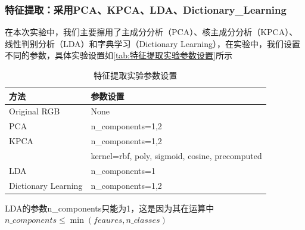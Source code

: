 \documentclass[12pt,hyperref,a4paper,UTF8]{ctexart}
\begin{document}
\subsubsection{特征提取：采用PCA、KPCA、LDA、Dictionary\_Learning}
在本次实验中，我们主要擦用了主成分分析（PCA）、核主成分分析（KPCA）、线性判别分析（LDA）和字典学习（Dictionary Learning），在实验中，我们设置不同的参数，具体实验设置如\autoref{tab:特征提取实验参数设置}所示

\begin{table}[!htbp]

\caption{特征提取实验参数设置}
    \centering
    \begin{tabular}{ll}
    \hline
        \textbf{方法} & \textbf{参数设置} \\
        \hline
        Original RGB & None \\
        
        PCA  & n\_components=1,2 \\
        
        KPCA & n\_components=1,2 \\
          & kernel=rbf, poly, sigmoid, cosine, precomputed \\
          
        LDA  & n\_components=1 \\
        
        Dictionary Learning  & n\_components=1,2 \\
        \hline
    \end{tabular}
    \label{tab:特征提取实验参数设置}
\end{table}

\par
LDA的参数n\_components只能为1，这是因为其在运算中$n\_components \le \min (feaures, n\_classes)$
\end{document}
